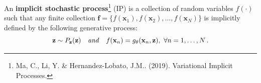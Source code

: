     \begin{frame}
    \begin{overprint}
        An \textbf{\alert{implicit stochastic process}}\footnote{
Ma, C., Li, Y. \& Hernandez-Lobato, J.M.. (2019). Variational Implicit Processes.} (IP) is a collection of random variables \( f(\cdot) \) such that any finite collection \( \mathbf f = \{f(\mathbf x_1), f(\mathbf x_2), \dots, f(\mathbf x_N) \} \) is implicitly defined by the following generative process:
        \[
            \mathbf z \sim P_{\mathbf z}(\mathbf z) \quad \text{\emph{and}} \quad f(\mathbf x_n) = g_{\mathbf \theta}(\mathbf x_n, \mathbf z), \ \forall n =1, \dots, N\,.
        \]
        \end{overprint}
    \begin{overprint}
    \end{overprint}
    \end{frame}



